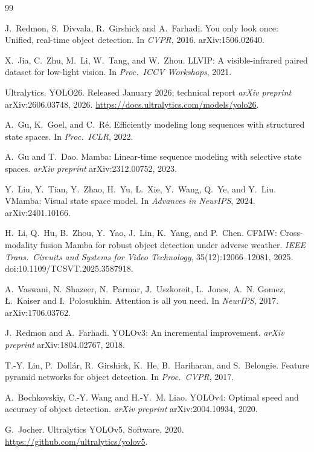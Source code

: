\begin{thebibliography}{99}

J.~Redmon, S.~Divvala, R.~Girshick and A.~Farhadi.
You only look once: Unified, real-time object detection.
In \textit{CVPR}, 2016. arXiv:1506.02640.

X.~Jia, C.~Zhu, M.~Li, W.~Tang, and W.~Zhou.
LLVIP: A visible-infrared paired dataset for low-light vision.
In \textit{Proc.\ ICCV Workshops}, 2021.

Ultralytics.
YOLO26. Released January 2026; technical report \textit{arXiv preprint}
arXiv:2606.03748, 2026. \url{https://docs.ultralytics.com/models/yolo26}.

A.~Gu, K.~Goel, and C.~R\'e.
Efficiently modeling long sequences with structured state spaces.
In \textit{Proc.\ ICLR}, 2022.

A.~Gu and T.~Dao.
Mamba: Linear-time sequence modeling with selective state spaces.
\textit{arXiv preprint} arXiv:2312.00752, 2023.

Y.~Liu, Y.~Tian, Y.~Zhao, H.~Yu, L.~Xie, Y.~Wang, Q.~Ye, and Y.~Liu.
VMamba: Visual state space model.
In \textit{Advances in NeurIPS}, 2024. arXiv:2401.10166.

H.~Li, Q.~Hu, B.~Zhou, Y.~Yao, J.~Lin, K.~Yang, and P.~Chen.
CFMW: Cross-modality fusion Mamba for robust object detection under adverse
weather. \textit{IEEE Trans.\ Circuits and Systems for Video Technology},
35(12):12066--12081, 2025. doi:10.1109/TCSVT.2025.3587918.

A.~Vaswani, N.~Shazeer, N.~Parmar, J.~Uszkoreit, L.~Jones, A.~N. Gomez, {\L}.~Kaiser and I.~Polosukhin.
Attention is all you need.
In \textit{NeurIPS}, 2017. arXiv:1706.03762.

J.~Redmon and A.~Farhadi.
YOLOv3: An incremental improvement.
\textit{arXiv preprint} arXiv:1804.02767, 2018.

T.-Y. Lin, P.~Doll\'ar, R.~Girshick, K.~He, B.~Hariharan, and S.~Belongie.
Feature pyramid networks for object detection.
In \textit{Proc.\ CVPR}, 2017.

A.~Bochkovskiy, C.-Y. Wang and H.-Y.~M. Liao.
YOLOv4: Optimal speed and accuracy of object detection.
\textit{arXiv preprint} arXiv:2004.10934, 2020.

G.~Jocher.
Ultralytics YOLOv5. Software, 2020. \url{https://github.com/ultralytics/yolov5}.


\end{thebibliography}
